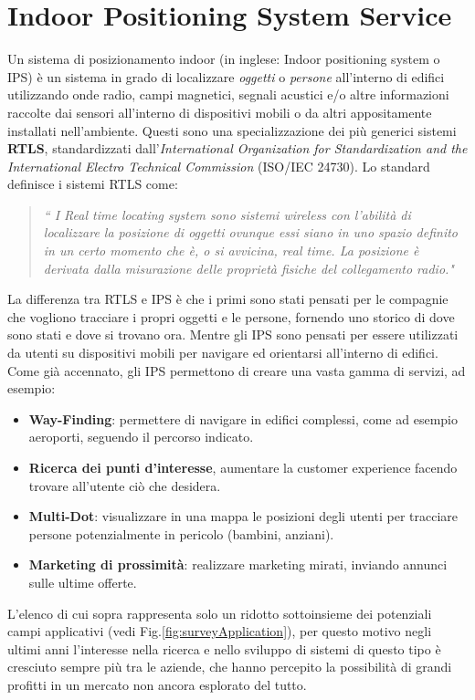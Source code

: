 \section{Indoor Positioning System Service}
Un sistema di posizionamento indoor (in inglese: Indoor positioning system o IPS) è un sistema in grado di localizzare \textit{oggetti} o \textit{persone} all'interno di edifici utilizzando onde radio, campi magnetici, segnali acustici e/o altre informazioni raccolte dai sensori all'interno di dispositivi mobili \cite{IPS} o da altri  appositamente installati nell'ambiente. Questi sono una specializzazione dei più generici sistemi \textbf{RTLS}, standardizzati dall'\textit{International
Organization for Standardization and the International Electro Technical Commission} (ISO/IEC 24730). Lo standard definisce i sistemi RTLS come:
\begin{quotation}
	\textit{“ I Real time locating system sono sistemi wireless con l'abilità di localizzare la posizione di oggetti ovunque essi siano in uno spazio definito in un certo momento che è, o si avvicina, real time. La posizione è derivata dalla misurazione delle proprietà fisiche del collegamento radio."}
\end{quotation}
La differenza tra RTLS e IPS è che i primi sono stati pensati per le compagnie che vogliono tracciare i propri oggetti e le persone, fornendo uno storico di dove sono stati e dove si trovano ora. Mentre gli IPS sono pensati per essere utilizzati da utenti su dispositivi mobili per navigare ed orientarsi all'interno di edifici.
Come già accennato, gli IPS \cite{IPS2} permettono di creare una vasta gamma di servizi, ad esempio:
\begin{itemize}
	\item\textbf{ Way-Finding}: permettere di navigare in edifici complessi, come ad esempio aeroporti, seguendo il percorso indicato.
	\item\textbf{ Ricerca dei punti d'interesse}, aumentare la customer experience facendo trovare all’utente ciò che desidera.
	\item \textbf{Multi-Dot}: visualizzare in una mappa le posizioni degli utenti per tracciare persone potenzialmente in pericolo (bambini, anziani).
	\item \textbf{Marketing di prossimità}: realizzare marketing mirati, inviando annunci sulle ultime offerte.
\end{itemize}
L’elenco di cui sopra rappresenta solo un ridotto sottoinsieme dei potenziali campi applicativi (vedi Fig.\ref{fig:surveyApplication}), per questo motivo negli ultimi anni \cite{indoorThesis} l'interesse nella ricerca e nello sviluppo di sistemi di questo tipo è cresciuto sempre più tra le aziende, che hanno percepito la possibilità di grandi profitti in un mercato non ancora esplorato del tutto.
